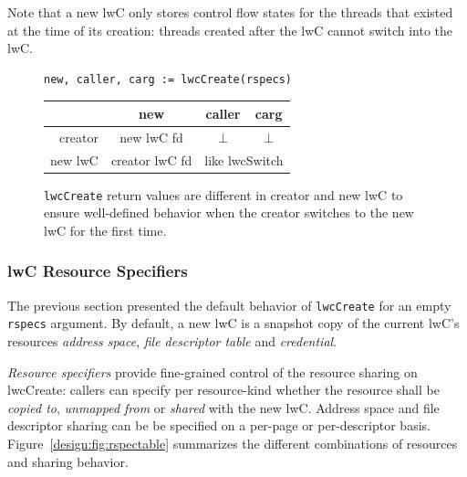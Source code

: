 \documentclass[10pt,twocolumn,a4paper]{article}
\begin{document}
Note that a new lwC only stores control flow states for the threads that existed at the time of its creation:
threads created after the lwC cannot switch into the lwC.

\vspace{1.5em}
\begin{figure}[h]
  \centering
  \begin{framed}
\begin{lstlisting}[mathescape,aboveskip=0pt]
  new, caller, carg := lwcCreate(rspecs)
\end{lstlisting}
\begin{tabular}{|r||c|c|c|}
  \hline
                &   new        & caller       & carg \\
  \hline\hline
  creator       & new lwC fd   & $\bot$      & $\bot$\\
  \hline
  new lwC       &    creator lwC fd   & \multicolumn{2}{c|}{like lwcSwitch}\\
  \hline
\end{tabular}
\end{framed}
\caption{
  \texttt{lwcCreate} return values are different in creator and new lwC to ensure well-defined behavior when the creator switches to the new lwC for the first time.
}
\end{figure}


\subsubsection{lwC Resource Specifiers}\label{design:rspecs}
The previous section presented the default behavior of \lstinline{lwcCreate} for an empty \lstinline{rspecs} argument.
By default, a new lwC is a snapshot copy of the current lwC's resources \textit{address space}, \textit{file descriptor table} and \textit{credential}.

\textit{Resource specifiers} provide fine-grained control of the resource sharing on lwcCreate:
callers can specify per resource-kind whether the resource shall be \textit{copied to}, \textit{unmapped from} or \textit{shared} with the new lwC.
Address space and file descriptor sharing can be be specified on a per-page or per-descriptor basis.
Figure~\ref{design:fig:rspectable} summarizes the different combinations of resources and sharing behavior.
\cite{lwcpaper}
\end{document}
